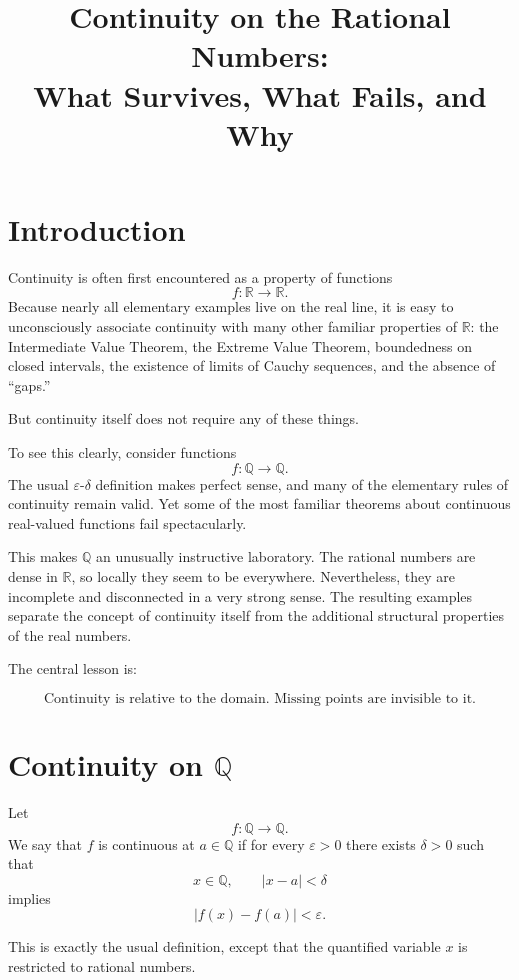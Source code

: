 \documentclass{essay}
\title{Continuity on the Rational Numbers:\\
What Survives, What Fails, and Why}
\author{}
\date{}
\begin{document}
\maketitle

\section{Introduction}

Continuity is often first encountered as a property of functions
\[ f:\mathbb{R}\to\mathbb{R}. \]
Because nearly all elementary examples live on the real line, it is easy to
unconsciously associate continuity with many other familiar properties of
\(\mathbb{R}\): the Intermediate Value Theorem, the Extreme Value Theorem,
boundedness on closed intervals, the existence of limits of Cauchy sequences,
and the absence of ``gaps.''

But continuity itself does not require any of these things.

To see this clearly, consider functions
\[ f:\mathbb{Q}\to\mathbb{Q}. \]
The usual \(\varepsilon\)-\(\delta\) definition makes perfect sense, and many of
the elementary rules of continuity remain valid. Yet some of the most familiar
theorems about continuous real-valued functions fail spectacularly.

This makes \(\mathbb{Q}\) an unusually instructive laboratory. The rational
numbers are dense in \(\mathbb{R}\), so locally they seem to be everywhere.
Nevertheless, they are incomplete and disconnected in a very strong sense.
The resulting examples separate the concept of continuity itself from the
additional structural properties of the real numbers.

The central lesson is:

\[ \boxed{\text{Continuity is relative to the domain. Missing points are invisible to it.}} \]

\section{Continuity on \(\mathbb{Q}\)}

Let
\[ f:\mathbb{Q}\to\mathbb{Q}. \]
We say that \(f\) is continuous at \(a\in\mathbb{Q}\) if for every
\(\varepsilon>0\) there exists \(\delta>0\) such that
\[ x\in\mathbb{Q},\qquad |x-a|<\delta \]
implies
\[ |f(x)-f(a)|<\varepsilon. \]

This is exactly the usual definition, except that the quantified variable
\(x\) is restricted to rational numbers.
\end{document}
